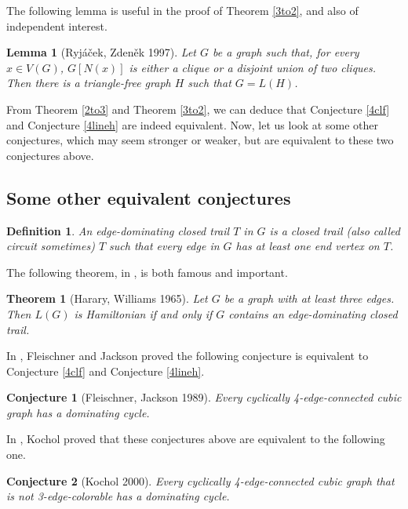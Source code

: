 \documentclass[12pt]{report}
\newtheorem{theorem}{Theorem}
\newtheorem{definition}{Definition}
\newtheorem{conjecture}{Conjecture}
\newtheorem{lemma}{Lemma}
\begin{document}
The following lemma is useful in the proof of Theorem \ref{3to2}, and also of independent interest.

\begin{lemma}[Ryj{\'a}{\v{c}}ek, Zden{\v{e}}k 1997]\label{3to2lm1}
Let $G$ be a graph such that, for every $x\in V(G)$, $G[N(x)]$ is either a clique or a disjoint union of two cliques. Then there is a triangle-free graph $H$ such that $G=L(H)$.
\end{lemma}

From Theorem \ref{2to3} and Theorem \ref{3to2}, we can deduce that Conjecture \ref{4clf} and Conjecture \ref{4lineh} are indeed equivalent.
Now, let us look at some other conjectures, which may seem stronger or weaker, but are equivalent to these two conjectures above.

\subsection{Some other equivalent conjectures}
\begin{definition}
An {\em edge-dominating closed trail} $T$ in $G$ is a closed trail (also called circuit sometimes) $T$ such that every edge in $G$ has at least one end vertex on $T$.
\end{definition}

The following theorem, in \cite{harary1965eulerian}, is both famous and important.

\begin{theorem}[Harary, Williams 1965]\label{dctl}
Let $G$ be a graph with at least three edges. Then $L(G)$ is Hamiltonian if and only if $G$ contains an edge-dominating closed trail.
\end{theorem}


In \cite{fleischner1988note}, Fleischner and Jackson proved the following conjecture is equivalent to Conjecture \ref{4clf} and Conjecture \ref{4lineh}.


\begin{conjecture}[Fleischner, Jackson 1989]\label{flejac}
Every cyclically 4-edge-connected cubic graph has a dominating cycle.
\end{conjecture}


In \cite{kochol2000equivalence}, Kochol proved that these conjectures above are equivalent to the following one.
\begin{conjecture}[Kochol 2000]\label{kochole}
Every cyclically 4-edge-connected cubic graph that is not 3-edge-colorable has a dominating cycle.
\end{conjecture}
\end{document}

